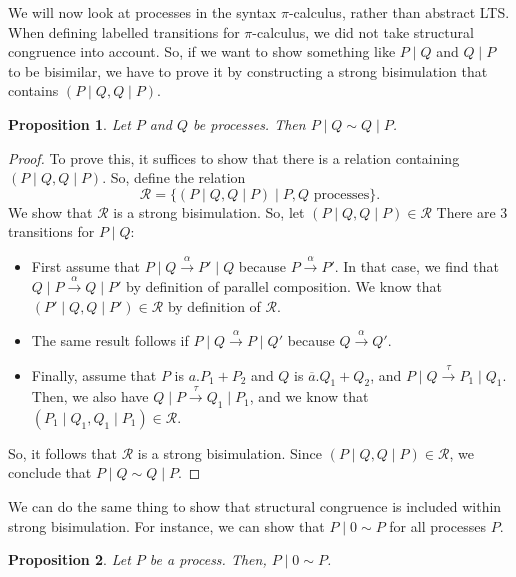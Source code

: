 \documentclass[a4paper, openany]{memoir}
\newtheorem{proposition}{Proposition}[section]
\theoremstyle{definition}
\begin{document}
    We will now look at processes in the syntax $\pi$-calculus, rather than abstract LTS. When defining labelled transitions for $\pi$-calculus, we did not take structural congruence into account. So, if we want to show something like $P \mid Q$ and $Q \mid P$ to be bisimilar, we have to prove it by constructing a strong bisimulation that contains $(P \mid Q, Q \mid P)$. 
    
    \begin{proposition}
        Let $P$ and $Q$ be processes. Then $P \mid Q \sim Q \mid P$.
    \end{proposition}
    \begin{proof}
        To prove this, it suffices to show that there is a relation containing $(P \mid Q, Q \mid P)$. So, define the relation
        \[\mathcal{R} = \{(P \mid Q, Q \mid P) \mid P, Q \textrm{ processes}\}.\]
        We show that $\mathcal{R}$ is a strong bisimulation. So, let $(P \mid Q, Q \mid P) \in \mathcal{R}$ There are 3 transitions for $P \mid Q$:
        \begin{itemize}
            \item First assume that $P \mid Q \xrightarrow{\alpha} P' \mid Q$ because $P \xrightarrow{\alpha} P'$. In that case, we find that $Q \mid P \xrightarrow{\alpha} Q \mid P'$ by definition of parallel composition. We know that $(P' \mid Q, Q \mid P') \in \mathcal{R}$ by definition of $\mathcal{R}$.
            
            \item The same result follows if $P \mid Q \xrightarrow{\alpha} P \mid Q'$ because $Q \xrightarrow{\alpha} Q'$.
            
            \item Finally, assume that $P$ is $a.P_1 + P_2$ and $Q$ is $\overline{a}.Q_1 + Q_2$, and $P \mid Q \xrightarrow{\tau} P_1 \mid Q_1$. Then, we also have $Q \mid P \xrightarrow{\tau} Q_1 \mid P_1$, and we know that $(P_1 \mid Q_1, Q_1 \mid P_1) \in \mathcal{R}$.
        \end{itemize}
        So, it follows that $\mathcal{R}$ is a strong bisimulation. Since $(P \mid Q, Q \mid P) \in \mathcal{R}$, we conclude that $P \mid Q \sim Q \mid P$.
    \end{proof}
    \noindent We can do the same thing to show that structural congruence is included within strong bisimulation. For instance, we can show that $P \mid 0 \sim P$ for all processes $P$.
    \begin{proposition}
        Let $P$ be a process. Then, $P \mid 0 \sim P$. 
    \end{proposition}
\end{document}
